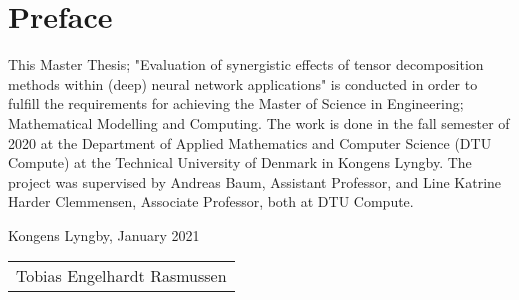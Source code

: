 \section{Preface}

\noindent This Master Thesis; "Evaluation of synergistic effects of tensor decomposition methods within (deep) neural network applications" is conducted in order to fulfill the requirements for achieving the Master of Science in Engineering; Mathematical Modelling and Computing. The work is done in the fall semester of 2020 at the Department of Applied Mathematics and Computer Science (DTU Compute) at the Technical University of Denmark in Kongens Lyngby. The project was supervised by Andreas Baum, Assistant Professor, and Line Katrine Harder Clemmensen, Associate Professor, both at DTU Compute.

\vspace{4cm}
\begin{flushright}
Kongens Lyngby, January 2021 \\
\vspace{2cm}

\begin{tabular}{l}
                            \\ \hline
Tobias Engelhardt Rasmussen
\end{tabular}

\end{flushright}
